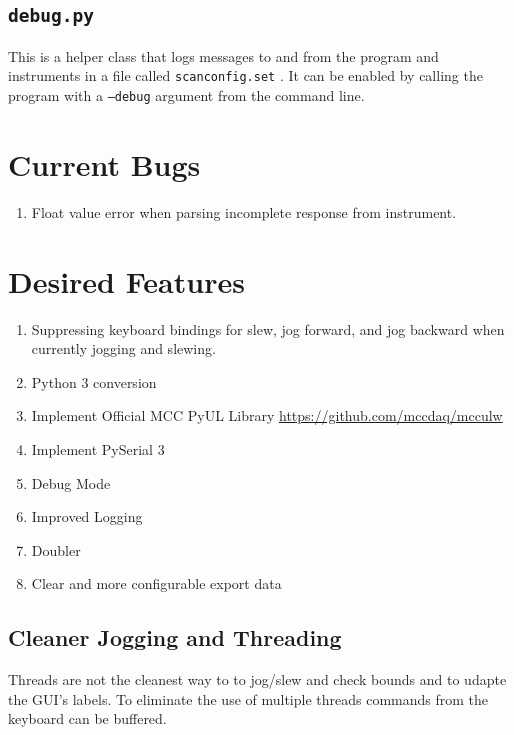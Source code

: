 \documentclass[11pt]{article}
\begin{document}
\subsection{\texttt{debug.py}}
This is a helper class that logs messages to and from the program and instruments in a file called \texttt{scan\textunderscore config.set} . It can be enabled by calling the program with a \texttt{--debug} argument from the command line.
\section{Current Bugs}
\begin{enumerate}
    \item Float value error when parsing incomplete response from instrument.
\end{enumerate}
\section{Desired Features}
\begin{enumerate}
    \item Suppressing keyboard bindings for slew, jog forward, and jog backward when currently jogging and slewing.
    \item Python 3 conversion 
    \item Implement Official MCC PyUL Library \url{https://github.com/mccdaq/mcculw}
    \item Implement PySerial 3
    \item Debug Mode
    \item Improved Logging 
    \item Doubler 
    \item Clear and more configurable export data
\end{enumerate}
\subsection{Cleaner Jogging and Threading}
Threads are not the cleanest way to to jog/slew and check bounds and to udapte the GUI's labels. To eliminate the use of multiple threads commands from the keyboard can be buffered.
\end{document}
